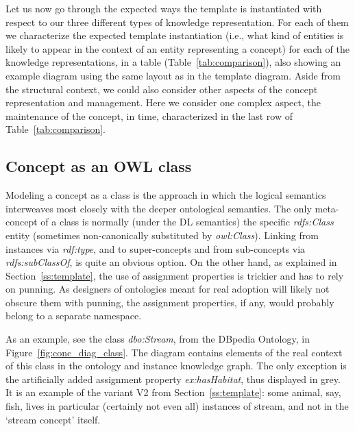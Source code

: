 Let us now go through the expected ways the template is instantiated with respect to our three different types of knowledge representation.
For each of them we characterize the expected template instantiation (i.e., what kind of entities is likely to appear in the context of an entity representing a concept) for each of the knowledge representations, in a table (Table~\ref{tab:comparison}), also showing an example diagram using the same layout as in the template diagram. 
Aside from the structural context, we could also consider other aspects of the concept representation and management. 
Here we consider one complex aspect, the maintenance of the concept, in time, characterized in the last row of Table~\ref{tab:comparison}.



\subsection{Concept as an OWL class}

Modeling a concept as a class is the approach in which the logical semantics interweaves most closely with the deeper ontological semantics.
The only meta-concept of a class is normally (under the DL semantics) the specific \emph{rdfs:Class} entity (sometimes non-canonically substituted by \emph{owl:Class}).
Linking from instances via \emph{rdf:type}, and to super-concepts and from sub-concepts via \emph{rdfs:subClassOf}, is quite an obvious option.
On the other hand, as explained in Section~\ref{ss:template}, the use of assignment properties is trickier and has to rely on punning.
As designers of ontologies meant for real adoption will likely not obscure them with punning, the assignment properties, if any, would probably belong to a separate namespace. 

As an example, see the class \emph{dbo:Stream}, from the DBpedia Ontology, in Figure~\ref{fig:conc_diag_class}. 
The diagram contains elements of the real context of this class in the ontology and instance knowledge graph.
The only exception is the artificially added assignment property \emph{ex:hasHabitat}, thus displayed in grey.
It is an example of the variant V2 from Section~\ref{ss:template}: some animal, say, fish, lives in particular (certainly not even all) instances of stream, and not in the `stream concept' itself.


